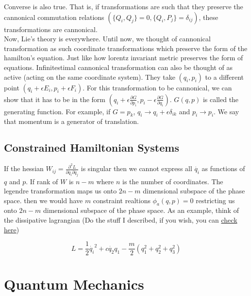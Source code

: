 \documentclass{report}
\begin{document}
\noindent Converse is also true. That is, if transformations are such that they preserve the cannonical commutation relations $(\{Q_i,Q_j\}=0, \{Q_i,P_j\}=\delta_{ij})$, these transformations are cannonical.\\

\noindent Now, Lie's theory is everywhere. Until now, we thought of cannonical transformation as such coordinate transformations which preserve the form of the hamilton's equation. Just like how lorentz invariant metric preserves the form of equations. Infinitestimal cannonical transformation can also be thought of as active (acting on the same coordinate system). They take $(q_i,p_i)$ to a different point $(q_i+\epsilon E_i, p_i+\epsilon F_i)$. For this transformation to be cannonical, we can show that it has to be in the form $(q_i+\epsilon\frac{\partial G}{\partial p_i}, p_i-\epsilon\frac{\partial G}{\partial q_i})$. $G(q,p)$ is called the generating function. For example, if $G = p_k$, $q_i \rightarrow q_i+\epsilon\delta_{ik}$ and $p_i\rightarrow p_i$. We say that momentum is a generator of translation.

\section{Constrained Hamiltonian Systems}

If the hessian $ W_{ij} = \frac{\partial^2 L}{\partial \dot{q_i} \partial \dot{q_j}}$ is singular then we cannot express all $\dot{q_i}$ as functions of $q$ and $p$. If rank of $W$ is $n-m$ where $n$ is the number of coordinates. The legendre transformation maps us onto $2n-m$ dimensional subspace of the phase space. then we would have $m$ constraint realtions $\phi_a(q,p)=0$ restricting us onto $2n-m$ dimensional subspace of the phase space. As an example, think of the dissipative lagrangian (Do the stuff I described, if you wish, you can \href{https://www.youtube.com/watch?v=xj8QL3QIyfs}{check here})

$$L = \frac{1}{2}\dot{q_i}^2 + c \dot{q_2}{q_1}-\frac{m}{2}(q_1^2 + q_2^2 + q_3^2 )$$



\chapter{Quantum Mechanics}
\end{document}
